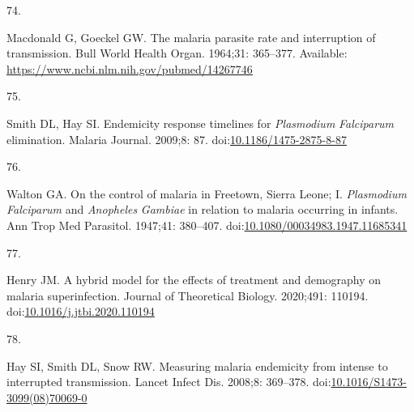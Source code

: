 \documentclass[
]{book}
\newlength{\cslhangindent}
\newlength{\csllabelwidth}
\newenvironment{CSLReferences}[2] %
 {\begin{list}{}{%
  \setlength{\itemindent}{0pt}
  \setlength{\leftmargin}{0pt}
  \setlength{\parsep}{0pt}
  \ifodd #1
   \setlength{\leftmargin}{\cslhangindent}
   \setlength{\itemindent}{-1\cslhangindent}
  \fi
  \setlength{\itemsep}{#2\baselineskip}}}
 {\end{list}}
\newcommand{\CSLLeftMargin}[1]{\parbox[t]{\csllabelwidth}{\strut#1\strut}}
\newcommand{\CSLRightInline}[1]{\parbox[t]{\linewidth - \csllabelwidth}{\strut#1\strut}}
\begin{document}
\begin{CSLReferences}{0}{1}
\CSLLeftMargin{74. }%
\CSLRightInline{Macdonald G, Goeckel GW. The malaria parasite rate and interruption of transmission. Bull World Health Organ. 1964;31: 365--377. Available: \url{https://www.ncbi.nlm.nih.gov/pubmed/14267746}}

\CSLLeftMargin{75. }%
\CSLRightInline{Smith DL, Hay SI. Endemicity response timelines for {\emph{Plasmodium}}{ \emph{Falciparum}} elimination. Malaria Journal. 2009;8: 87. doi:\href{https://doi.org/10.1186/1475-2875-8-87}{10.1186/1475-2875-8-87}}

\CSLLeftMargin{76. }%
\CSLRightInline{Walton GA. On the control of malaria in {Freetown}, {Sierra Leone}; {I}. {\emph{Plasmodium}}{ \emph{Falciparum}} and {\emph{Anopheles}}{ \emph{Gambiae}} in relation to malaria occurring in infants. Ann Trop Med Parasitol. 1947;41: 380--407. doi:\href{https://doi.org/10.1080/00034983.1947.11685341}{10.1080/00034983.1947.11685341}}

\CSLLeftMargin{77. }%
\CSLRightInline{Henry JM. A hybrid model for the effects of treatment and demography on malaria superinfection. Journal of Theoretical Biology. 2020;491: 110194. doi:\href{https://doi.org/10.1016/j.jtbi.2020.110194}{10.1016/j.jtbi.2020.110194}}

\CSLLeftMargin{78. }%
\CSLRightInline{Hay SI, Smith DL, Snow RW. Measuring malaria endemicity from intense to interrupted transmission. Lancet Infect Dis. 2008;8: 369--378. doi:\href{https://doi.org/10.1016/S1473-3099(08)70069-0}{10.1016/S1473-3099(08)70069-0}}

\end{CSLReferences}
\end{document}
